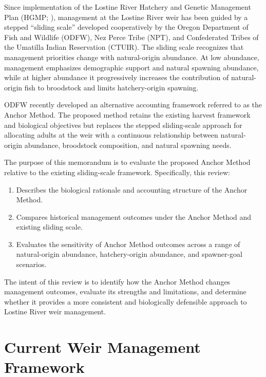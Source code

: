 \documentclass[12pt,letterpaper]{article}
\providecommand{\tightlist}{%
  \setlength{\itemsep}{0pt}\setlength{\parskip}{0pt}}
\begin{document}
Since implementation of the Lostine River Hatchery and Genetic Management Plan (HGMP; \textcite{npt_hatchery_2011}), management at the Lostine River weir has been guided by a stepped ``sliding scale'' developed cooperatively by the Oregon Department of Fish and Wildlife (ODFW), Nez Perce Tribe (NPT), and Confederated Tribes of the Umatilla Indian Reservation (CTUIR). The sliding scale recognizes that management priorities change with natural-origin abundance. At low abundance, management emphasizes demographic support and natural spawning abundance, while at higher abundance it progressively increases the contribution of natural-origin fish to broodstock and limits hatchery-origin spawning.

ODFW recently developed an alternative accounting framework referred to as the Anchor Method. The proposed method retains the existing harvest framework and biological objectives but replaces the stepped sliding-scale approach for allocating adults at the weir with a continuous relationship between natural-origin abundance, broodstock composition, and natural spawning needs.

The purpose of this memorandum is to evaluate the proposed Anchor Method relative to the existing sliding-scale framework. Specifically, this review:

\begin{enumerate}
\def\labelenumi{\arabic{enumi}.}
\tightlist
\item
  Describes the biological rationale and accounting structure of the Anchor Method.
\item
  Compares historical management outcomes under the Anchor Method and existing sliding scale.
\item
  Evaluates the sensitivity of Anchor Method outcomes across a range of natural-origin abundance, hatchery-origin abundance, and spawner-goal scenarios.
\end{enumerate}

The intent of this review is to identify how the Anchor Method changes management outcomes, evaluate its strengths and limitations, and determine whether it provides a more consistent and biologically defensible approach to Lostine River weir management.

\section{Current Weir Management Framework}\label{current-weir-management-framework}
\end{document}
